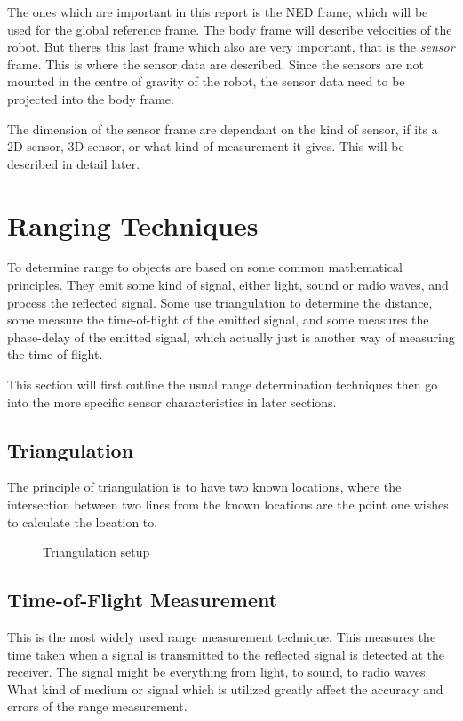     The ones which are important in this report is the NED frame, which will be used for
    the global reference frame. The body frame will describe velocities of the robot. But
    theres this last frame which also are very important, that is the \emph{sensor} frame.
    This is where the sensor data are described. Since the sensors are not mounted in the
    centre of gravity of the robot, the sensor data need to be projected into the body
    frame. 

    The dimension of the sensor frame are dependant on the kind of sensor, if its a 2D
    sensor, 3D sensor, or what kind of measurement it gives. This will be described in
    detail later.
	

\section{Ranging Techniques}
To determine range to objects are based on some common mathematical principles. They emit
some kind of signal, either light, sound or radio waves, and process the reflected signal.
Some use triangulation to determine the distance, some measure the time-of-flight of the
emitted signal, and some measures the phase-delay of the emitted signal, which actually
just is another way of measuring the time-of-flight. 

This section will first outline the usual range determination techniques then go into the
more specific sensor characteristics in later sections. 


\subsection{Triangulation}
The principle of triangulation is to have two known locations, where the intersection
between two lines from the known locations are the point one wishes to calculate the
location to. 

\begin{figure}[htbp]
    \caption{Triangulation setup}
    \label{fig:triangulation}
\end{figure}


\subsection{Time-of-Flight Measurement}
This is the most widely used range measurement technique. This measures the time taken
when a signal is transmitted to the reflected signal is detected at the receiver. The
signal might be everything from light, to sound, to radio waves. What kind of medium or
signal which is utilized greatly affect the accuracy and errors of the range measurement. 




